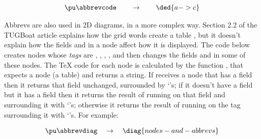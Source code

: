 \documentclass[oneside]{article}
\def\cded #1{\begin{matrix}\ded {#1}\end{matrix}}
\begin{document}


$$\pu
  \myvcenter{\abbrevcode}
  \qquad
  \to
  \qquad
  \cded{a->c}
$$


Abbrevs are also used in 2D diagrams, in a more complex way. Section
2.2 of the TUGBoat article explains how the grid words create a table
, but it doesn't explain how the fields  and
 in a node affect how it is displayed. The code below creates
nodes whose {\sl tags} are , , , , and
then changes the fields  and  in some of these
nodes. The \TeX{} code for each node is calculated by the function
, that expects a node (a table) and returns a
string. If  receives a node that has a 
field then it returns that field unchanged, surrounded by
`\co{\{\}}'s; if it doesn't have a  field but it has a
 field then it returns the result of running  on
that field and surrounding it with `\co{\{\}}'s; otherwise it returns
the result of running  on the tag surrounding it with
`\co{\{\}}'s. For example:


$$\pu
  \myvcenter{\abbrevdiag}
  \quad
  \to
  \quad
  \diag{nodes-and-abbrevs}
$$
\end{document}
